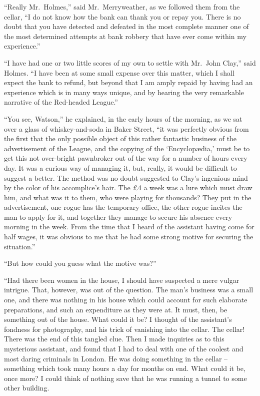 “Really Mr.~Holmes,” said Mr.~Merryweather, as we followed
them from the cellar, “I do not know how the bank can
thank you or repay you. There is no doubt that you have
detected and defeated in the most complete manner one of
the most determined attempts at bank robbery that have ever
come within my experience.”

“I have had one or two little scores of my own to settle
with Mr.~John Clay,” said Holmes. “I have been at some
small expense over this matter, which I shall expect the bank
to refund, but beyond that I am amply repaid by having had
an experience which is in many ways unique, and by hearing
the very remarkable narrative of the Red-headed League.”

\strut

“You see, Watson,” he explained, in the early hours of the
morning, as we sat over a glass of whiskey-and-soda in Baker
Street, “it was perfectly obvious from the first that the only
possible object of this rather fantastic business of the
advertisement of the League, and the copying of the ‘Encyclopædia,’
must be to get this not over-bright pawnbroker out of the
way for a number of hours every day. It was a curious way
of managing it, but, really, it would be difficult to suggest a
better. The method was no doubt suggested to Clay’s ingenious
mind by the color of his accomplice’s hair. The £4 a
week was a lure which must draw him, and what was it to
them, who were playing for thousands? They put in the
advertisement, one rogue has the temporary office, the other
rogue incites the man to apply for it, and together they manage
to secure his absence every morning in the week. From
the time that I heard of the assistant having come for half
wages, it was obvious to me that he had some strong motive
for securing the situation.”

“But how could you guess what the motive was?”

“Had there been women in the house, I should have suspected
a mere vulgar intrigue. That, however, was out of the
question. The man’s business was a small one, and there
was nothing in his house which could account for such elaborate
preparations, and such an expenditure as they were at.
It must, then, be something out of the house. What could it
be? I thought of the assistant’s fondness for photography,
and his trick of vanishing into the cellar. The cellar! There
was the end of this tangled clue. Then I made inquiries as
to this mysterious assistant, and found that I had to deal with
one of the coolest and most daring criminals in London. He
was doing something in the cellar -- something which took
many hours a day for months on end. What could it be, once
more? I could think of nothing save that he was running a
tunnel to some other building.

